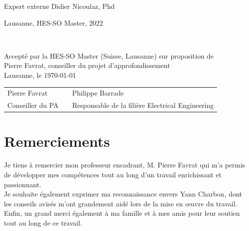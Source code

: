 \documentclass[../pa_rapport.tex]{subfiles}
\begin{document}
\begin{raggedleft}
\large Expert externe Didier Nicoulaz, Phd
\end{raggedleft}

\vfill
\large Lausanne, HES-SO Master, 2022

\thispagestyle{empty}
\newpage
\thispagestyle{empty}
\ 
\newpage
\thispagestyle{empty}
\raggedright
Accepté par la HES-SO Master (Suisse, Lausanne) sur proposition de\\[40pt]
Pierre Favrat, conseiller du projet d'approfondissement\\[40pt]

Lausanne, le \today\\[40pt]
\begin{center}
\begin{tabularx}{\textwidth}{
>{\raggedright\arraybackslash}X
c
>{\raggedright\arraybackslash}X
}
Pierre Favrat & \hspace{20pt} & Philippe Barrade\\
Conseiller du PA & \hspace{20pt} & Responsable de la filière Electrical Engineering\\
\end{tabularx}
\end{center}


\pagebreak
\thispagestyle{empty}
\section*{Remerciements}
Je tiens à remercier mon professeur encadrant, M. Pierre Favrat qui m'a permis de développer mes compétences tout au long d'un travail enrichissant et passionnant.\\
Je souhaite également exprimer ma reconnaissance envers Yann Charbon, dont les conseils avisés m'ont grandement aidé lors de la mise en œuvre du travail.\\
Enfin, un grand merci également à ma famille et à mes amis pour leur soutien tout au long de ce travail.
\thispagestyle{empty}
\tableofcontents
\pagebreak
\end{document}
